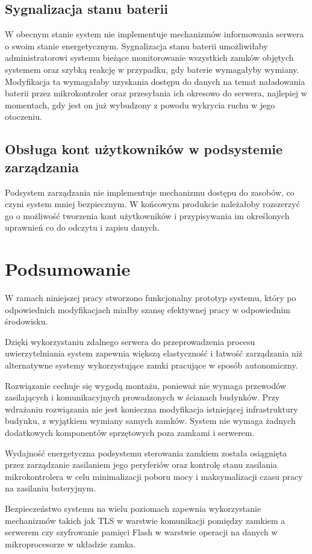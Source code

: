         \subsection{Sygnalizacja stanu baterii}

            W obecnym stanie system nie implementuje mechanizmów informowania serwera o swoim stanie energetycznym.
            Sygnalizacja stanu baterii umożliwiłaby administratorowi systemu bieżące monitorowanie wszystkich zamków objętych systemem oraz szybką reakcję w przypadku, gdy baterie wymagałyby wymiany. Modyfikacja ta wymagałaby uzyskania dostępu do danych na temat naładowania baterii przez mikrokontroler oraz przesyłania ich okresowo do serwera, najlepiej w momentach, gdy jest on już wybudzony z powodu wykrycia ruchu w jego otoczeniu.

        \subsection{Obsługa kont użytkowników w podsystemie zarządzania}
            Podsystem zarządzania nie implementuje mechanizmu dostępu do zasobów, co czyni system mniej bezpiecznym. W końcowym produkcie należałoby rozszerzyć go o możliwość tworzenia kont użytkowników i przypisywania im określonych uprawnień co do odczytu i zapisu danych.

    \section{Podsumowanie}

        W ramach niniejszej pracy stworzono funkcjonalny prototyp systemu, który po odpowiednich modyfikacjach miałby szansę efektywnej pracy w odpowiednim środowisku.

        Dzięki wykorzystaniu zdalnego serwera do przeprowadzenia procesu uwierzytelniania system zapewnia większą elastyczność i łatwość zarządzania niż alternatywne systemy wykorzystujące zamki pracujące w sposób autonomiczny.

        Rozwiązanie cechuje się wygodą montażu, ponieważ nie wymaga przewodów zasilających i komunikacyjnych prowadzonych w ścianach budynków. Przy wdrażaniu rozwiązania nie jest konieczna modyfikacja istniejącej infrastruktury budynku, z wyjątkiem wymiany samych zamków. System nie wymaga żadnych dodatkowych komponentów sprzętowych poza zamkami i serwerem.

        Wydajność energetyczna podsystemu sterowania zamkiem została osiągnięta przez zarządzanie zasilaniem jego peryferiów oraz kontrolę stanu zasilania mikrokontrolera w celu minimalizacji poboru mocy i maksymalizacji czasu pracy na zasilaniu bateryjnym.

        Bezpieczeństwo systemu na wielu poziomach zapewnia wykorzystanie mechanizmów takich jak TLS w warstwie komunikacji pomiędzy zamkiem a serwerem czy szyfrowanie pamięci Flash w warstwie operacji na danych w mikroprocesorze w układzie zamka.